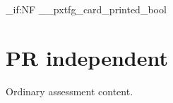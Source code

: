 \documentclass[TFG,PR,CAT]{P3CTeX}
\begin{document}
\ExplSyntaxOn
\bool_if:NF \g__pxtfg_card_printed_bool
  {\PackageError{pxTFG.PR.test}{TFG card was not printed automatically}{}}
\ExplSyntaxOff
\section{PR independent}
Ordinary assessment content.
\end{document}
